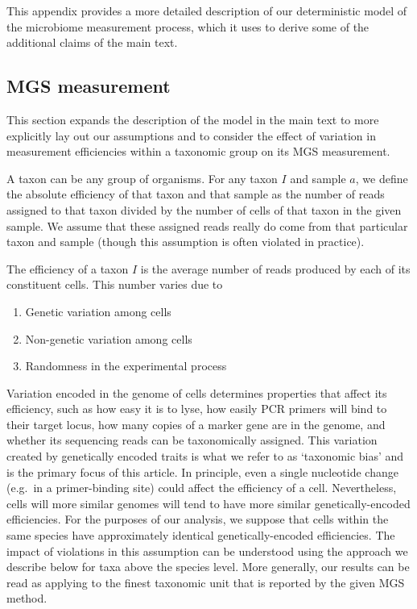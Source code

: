 \documentclass[
]{article}
\providecommand{\tightlist}{%
  \setlength{\itemsep}{0pt}\setlength{\parskip}{0pt}}
\begin{document}
This appendix provides a more detailed description of our deterministic model of the microbiome measurement process, which it uses to derive some of the additional claims of the main text.

\hypertarget{mgs-measurement}{%
\subsection{MGS measurement}\label{mgs-measurement}}

This section expands the description of the model in the main text to more explicitly lay out our assumptions and to consider the effect of variation in measurement efficiencies within a taxonomic group on its MGS measurement.

A taxon can be any group of organisms.
For any taxon \(I\) and sample \(a\), we define the absolute efficiency of that taxon and that sample as the number of reads assigned to that taxon divided by the number of cells of that taxon in the given sample.
We assume that these assigned reads really do come from that particular taxon and sample (though this assumption is often violated in practice).

The efficiency of a taxon \(I\) is the average number of reads produced by each of its constituent cells.
This number varies due to

\begin{enumerate}
\def\labelenumi{\arabic{enumi}.}
\tightlist
\item
  Genetic variation among cells
\item
  Non-genetic variation among cells
\item
  Randomness in the experimental process
\end{enumerate}

Variation encoded in the genome of cells determines properties that affect its efficiency, such as how easy it is to lyse, how easily PCR primers will bind to their target locus, how many copies of a marker gene are in the genome, and whether its sequencing reads can be taxonomically assigned.
This variation created by genetically encoded traits is what we refer to as `taxonomic bias' and is the primary focus of this article.
In principle, even a single nucleotide change (e.g.~in a primer-binding site) could affect the efficiency of a cell.
Nevertheless, cells will more similar genomes will tend to have more similar genetically-encoded efficiencies.
For the purposes of our analysis, we suppose that cells within the same species have approximately identical genetically-encoded efficiencies.
The impact of violations in this assumption can be understood using the approach we describe below for taxa above the species level.
More generally, our results can be read as applying to the finest taxonomic unit that is reported by the given MGS method.
\end{document}
